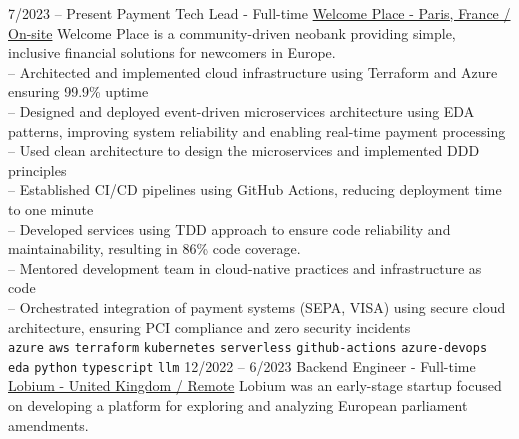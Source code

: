 \vspace{0.2cm}


\begin{entrylist}
    \entry
    {7/2023 -- Present}
    {Payment Tech Lead - Full-time}
    {
        \href{https://www.linkedin.com/company/welcome-place/}{Welcome Place - Paris, France / On-site}}
    {
        Welcome Place is a community-driven neobank providing simple, inclusive financial solutions for newcomers in Europe. \\

        -- Architected and implemented cloud infrastructure using Terraform and Azure ensuring 99.9\% uptime \\
        -- Designed and deployed event-driven microservices architecture using EDA patterns, improving system reliability and enabling real-time payment processing \\
        -- Used clean architecture to design the microservices and implemented DDD principles \\
        -- Established CI/CD pipelines using GitHub Actions, reducing deployment time to one minute \\
        -- Developed services using TDD approach to ensure code reliability and maintainability, resulting in 86\% code coverage. \\
        -- Mentored development team in cloud-native practices and infrastructure as code \\
        -- Orchestrated integration of payment systems (SEPA, VISA) using secure cloud architecture, ensuring PCI compliance and zero security incidents \\
        \texttt{azure}\slashsep
        \texttt{aws}\slashsep
        \texttt{terraform}\slashsep
        \texttt{kubernetes}\slashsep
        \texttt{serverless}\slashsep
        \texttt{github-actions}\slashsep
        \texttt{azure-devops}\slashsep
        \texttt{eda}\slashsep
        \texttt{python}\slashsep
        \texttt{typescript}\slashsep
        \texttt{llm}\slashsep
    }
    \entry
    {12/2022 -- 6/2023}
    {Backend Engineer - Full-time}
    {
        \href{https://www.linkedin.com/company/lobium/}{Lobium - United Kingdom / Remote}}
    {
        Lobium was an early-stage startup focused on developing a platform for exploring and analyzing European parliament amendments. \\
}
\end{entrylist}
